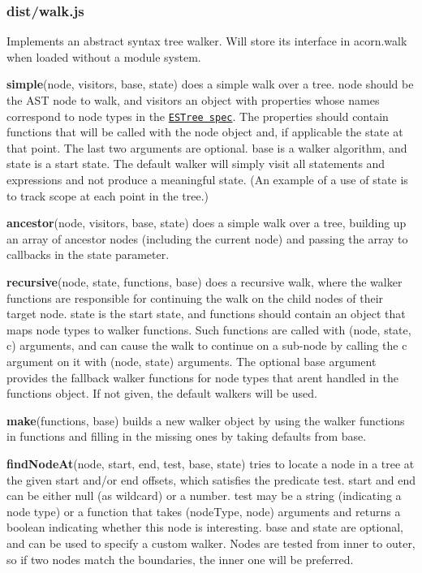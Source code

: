 \subsubsection*{dist/walk.\+js}

Implements an abstract syntax tree walker. Will store its interface in {\ttfamily acorn.\+walk} when loaded without a module system.

{\bfseries simple}{\ttfamily (node, visitors, base, state)} does a \textquotesingle{}simple\textquotesingle{} walk over a tree. {\ttfamily node} should be the A\+ST node to walk, and {\ttfamily visitors} an object with properties whose names correspond to node types in the \href{https://github.com/estree/estree}{\tt E\+S\+Tree spec}. The properties should contain functions that will be called with the node object and, if applicable the state at that point. The last two arguments are optional. {\ttfamily base} is a walker algorithm, and {\ttfamily state} is a start state. The default walker will simply visit all statements and expressions and not produce a meaningful state. (An example of a use of state is to track scope at each point in the tree.)

{\bfseries ancestor}{\ttfamily (node, visitors, base, state)} does a \textquotesingle{}simple\textquotesingle{} walk over a tree, building up an array of ancestor nodes (including the current node) and passing the array to callbacks in the {\ttfamily state} parameter.

{\bfseries recursive}{\ttfamily (node, state, functions, base)} does a \textquotesingle{}recursive\textquotesingle{} walk, where the walker functions are responsible for continuing the walk on the child nodes of their target node. {\ttfamily state} is the start state, and {\ttfamily functions} should contain an object that maps node types to walker functions. Such functions are called with {\ttfamily (node, state, c)} arguments, and can cause the walk to continue on a sub-\/node by calling the {\ttfamily c} argument on it with {\ttfamily (node, state)} arguments. The optional {\ttfamily base} argument provides the fallback walker functions for node types that aren\textquotesingle{}t handled in the {\ttfamily functions} object. If not given, the default walkers will be used.

{\bfseries make}{\ttfamily (functions, base)} builds a new walker object by using the walker functions in {\ttfamily functions} and filling in the missing ones by taking defaults from {\ttfamily base}.

{\bfseries find\+Node\+At}{\ttfamily (node, start, end, test, base, state)} tries to locate a node in a tree at the given start and/or end offsets, which satisfies the predicate {\ttfamily test}. {\ttfamily start} and {\ttfamily end} can be either {\ttfamily null} (as wildcard) or a number. {\ttfamily test} may be a string (indicating a node type) or a function that takes {\ttfamily (node\+Type, node)} arguments and returns a boolean indicating whether this node is interesting. {\ttfamily base} and {\ttfamily state} are optional, and can be used to specify a custom walker. Nodes are tested from inner to outer, so if two nodes match the boundaries, the inner one will be preferred.

